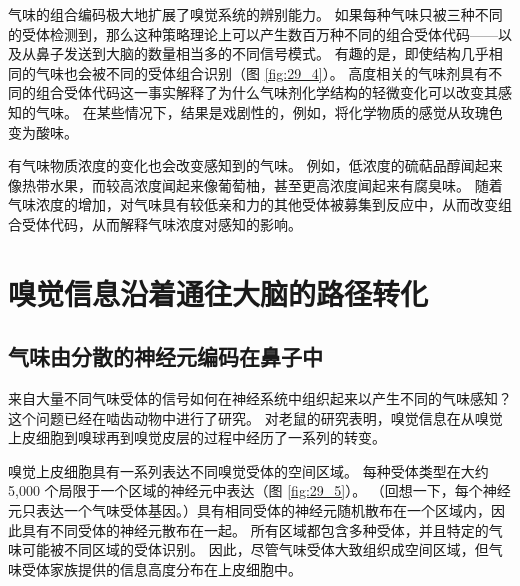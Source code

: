 气味的组合编码极大地扩展了嗅觉系统的辨别能力。 如果每种气味只被三种不同的受体检测到，那么这种策略理论上可以产生数百万种不同的组合受体代码——以及从鼻子发送到大脑的数量相当多的不同信号模式。 有趣的是，即使结构几乎相同的气味也会被不同的受体组合识别（图 \ref{fig:29_4}）。 高度相关的气味剂具有不同的组合受体代码这一事实解释了为什么气味剂化学结构的轻微变化可以改变其感知的气味。 在某些情况下，结果是戏剧性的，例如，将化学物质的感觉从玫瑰色变为酸味。

有气味物质浓度的变化也会改变感知到的气味。 例如，低浓度的硫萜品醇闻起来像热带水果，而较高浓度闻起来像葡萄柚，甚至更高浓度闻起来有腐臭味。 随着气味浓度的增加，对气味具有较低亲和力的其他受体被募集到反应中，从而改变组合受体代码，从而解释气味浓度对感知的影响。


\section{嗅觉信息沿着通往大脑的路径转化}
\subsection{气味由分散的神经元编码在鼻子中}
来自大量不同气味受体的信号如何在神经系统中组织起来以产生不同的气味感知？ 这个问题已经在啮齿动物中进行了研究。 对老鼠的研究表明，嗅觉信息在从嗅觉上皮细胞到嗅球再到嗅觉皮层的过程中经历了一系列的转变。

嗅觉上皮细胞具有一系列表达不同嗅觉受体的空间区域。 
每种受体类型在大约 5,000 个局限于一个区域的神经元中表达（图 \ref{fig:29_5}）。
（回想一下，每个神经元只表达一个气味受体基因。）具有相同受体的神经元随机散布在一个区域内，因此具有不同受体的神经元散布在一起。 所有区域都包含多种受体，并且特定的气味可能被不同区域的受体识别。 因此，尽管气味受体大致组织成空间区域，但气味受体家族提供的信息高度分布在上皮细胞中。

